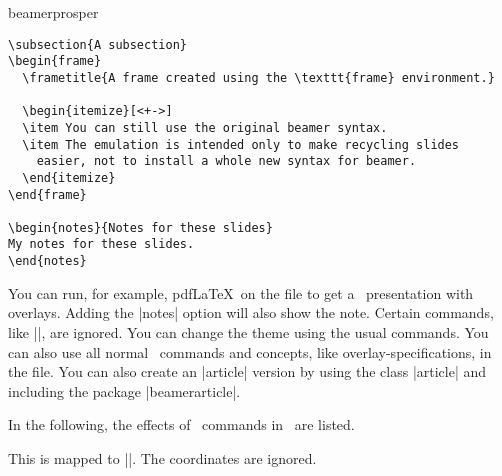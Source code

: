 \begin{package}{{beamerprosper}}
\begin{verbatim}
\subsection{A subsection}
\begin{frame}
  \frametitle{A frame created using the \texttt{frame} environment.}

  \begin{itemize}[<+->]
  \item You can still use the original beamer syntax.
  \item The emulation is intended only to make recycling slides
    easier, not to install a whole new syntax for beamer.
  \end{itemize}
\end{frame}

\begin{notes}{Notes for these slides}
My notes for these slides.
\end{notes}

\end{verbatim}
  You can run, for example, pdf\LaTeX\ on the file to get a \beamer\ presentation with overlays. Adding the |notes| option will also show the note. Certain commands, like |\LeftFoot|, are ignored. You can change the theme using the usual commands. You can also use all normal \beamer\ commands and concepts, like overlay-specifications, in the file. You can also create an |article| version by using the class |article| and including the package |beamerarticle|.
\end{package}

In the following, the effects of \prosper\ commands in \beamer\ are listed.



\begin{command}{\Logo{}}
  This is mapped to ||. The coordinates are ignored.
\end{command}

